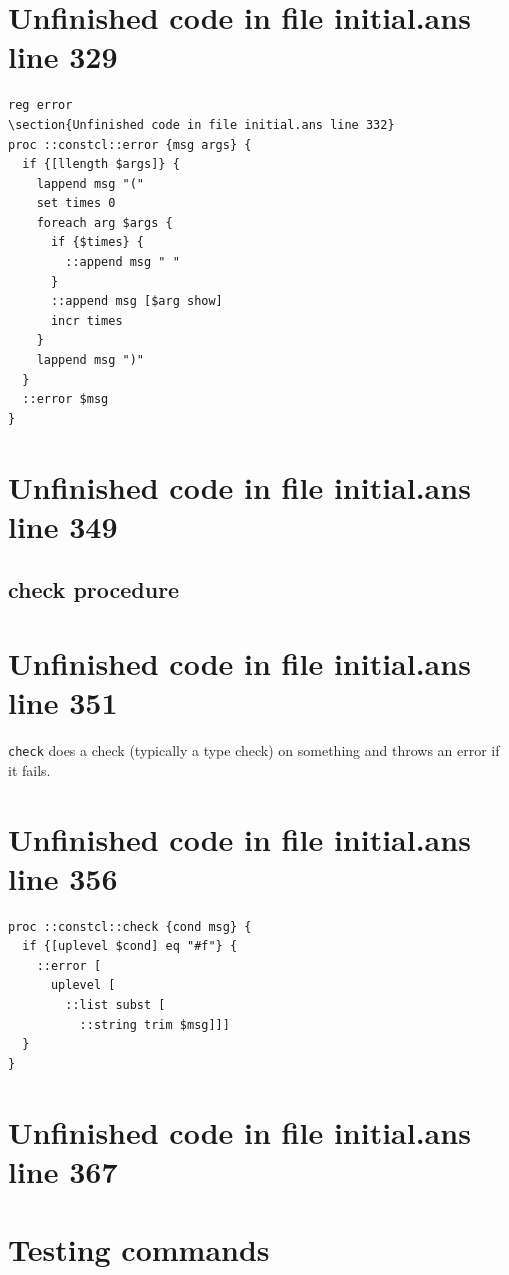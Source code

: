 \documentclass[twoside,9pt]{report}
\begin{document}
\section{Unfinished code in file initial.ans line 329}
\begin{lstlisting}
reg error
\section{Unfinished code in file initial.ans line 332}
proc ::constcl::error {msg args} {
  if {[llength $args]} {
    lappend msg "("
    set times 0
    foreach arg $args {
      if {$times} {
        ::append msg " "
      }
      ::append msg [$arg show]
      incr times
    }
    lappend msg ")"
  }
  ::error $msg
}
\end{lstlisting}
\section{Unfinished code in file initial.ans line 349}
\subsection{check procedure}
\label{check-procedure}
\section{Unfinished code in file initial.ans line 351}


\texttt{check} does a check (typically a type check) on something and throws an error if it fails.

\section{Unfinished code in file initial.ans line 356}
\begin{lstlisting}
proc ::constcl::check {cond msg} {
  if {[uplevel $cond] eq "#f"} {
    ::error [
      uplevel [
        ::list subst [
          ::string trim $msg]]]
  }
}
\end{lstlisting}
\section{Unfinished code in file initial.ans line 367}
\section{Testing commands}
\label{testing-commands}
\end{document}
